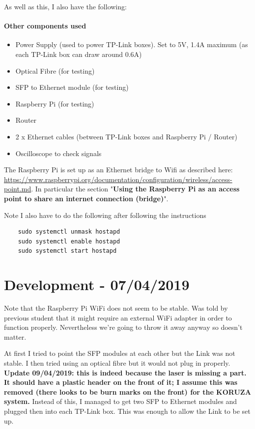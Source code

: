 As well as this, I also have the following:

\paragraph{\textbf{Other components used}}
\begin{itemize}
\item{Power Supply (used to power TP-Link boxes). Set to 5V, 1.4A maximum
(as each TP-Link box can draw around 0.6A)}
\item{Optical Fibre (for testing)}
\item{\ac{SFP} to Ethernet module (for testing)}
\item{Raspberry Pi (for testing)}
\item{Router}
\item{2 x Ethernet cables (between TP-Link boxes and Raspberry Pi / Router)}
\item{Oscilloscope to check signals}
\end{itemize}

The Raspberry Pi is set up as an Ethernet bridge to Wifi as described here:
\url{https://www.raspberrypi.org/documentation/configuration/wireless/access-point.md}.
In particular the section "\textbf{Using the Raspberry Pi as an access
point to share an internet connection (bridge)}".

Note I also have to do the following after following the instructions
\begin{lstlisting}
	sudo systemctl unmask hostapd
	sudo systemctl enable hostapd
	sudo systemctl start hostapd
\end{lstlisting}

\section{Development - 07/04/2019}
Note that the Raspberry Pi WiFi does not seem to be stable. Was told by previous
student that it might require an external WiFi adapter in order to function
properly. Nevertheless we're going to throw it away anyway so doesn't matter.

At first I tried to point the \ac{SFP} modules at each other but the Link was
not stable. I then tried using an optical fibre but it would not plug in
properly. \textbf{Update 09/04/2019: this is indeed because the laser is
missing a part. It should have a plastic header on the front of it; I assume
this was removed (there looks to be burn marks on the front) for the
KORUZA system.}
Instead of this, I managed to get two \ac{SFP} to Ethernet modules
and plugged then into each TP-Link box. This was enough to allow the Link
to be set up.

